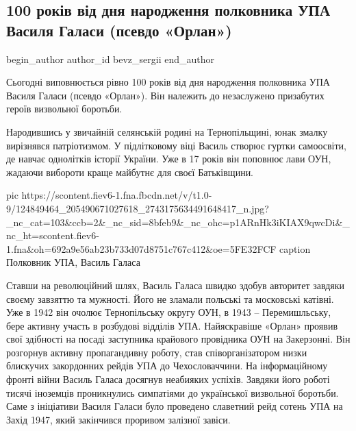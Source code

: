  
 
 
 
 
 
\subsection{100 років від дня народження полковника УПА Василя Галаси (псевдо «Орлан»)}
\label{sec:12_11_2020.fb.bevz_sergii.1.100_rokiv_upa_vasyl_galasa}
\ifcmt
	begin_author
   author_id bevz_sergii
	end_author
\fi
{}

Сьогодні виповнюється рівно 100 років від дня народження полковника УПА Василя
Галаси (псевдо «Орлан»). Він належить до незаслужено призабутих героїв
визвольної боротьби. 

Народившись у звичайній селянській родині на Тернопільщині, юнак змалку
вирізнявся патріотизмом. У підлітковому віці Василь створює гуртки самоосвіти,
де навчає однолітків історії України. Уже в 17 років він поповнює лави ОУН,
жадаючи вибороти краще майбутнє для своєї Батьківщини. 

\ifcmt
pic https://scontent.fiev6-1.fna.fbcdn.net/v/t1.0-9/124849464_205490671027618_2743175634491648417_n.jpg?_nc_cat=103&ccb=2&_nc_sid=8bfeb9&_nc_ohc=p1ARnHk3iKIAX9qwcDi&_nc_ht=scontent.fiev6-1.fna&oh=692a9e56ab23b733d07d8751c767c412&oe=5FE32FCF
caption Полковник УПА, Василь Галаса
\fi

Ставши на революційний шлях, Василь Галаса швидко здобув авторитет завдяки
своєму завзяттю та мужності. Його не зламали польські та московські катівні.
Уже в 1942 він очолює Тернопільську округу ОУН, в 1943 – Перемишльську, бере
активну участь в розбудові відділів УПА. Найяскравіше «Орлан» проявив свої
здібності на посаді заступника крайового провідника ОУН на Закерзонні. Він
розгорнув активну пропагандивну роботу, став співорганізатором низки блискучих
закордонних рейдів УПА до Чехословаччини. На інформаційному фронті війни Василь
Галаса досягнув неабияких успіхів. Завдяки його роботі тисячі іноземців
проникнулись симпатіями до української визвольної боротьби. Саме з  ініціативи
Василя Галаси було проведено славетний рейд сотень УПА на Захід 1947, який
закінчився проривом залізної завіси. 

